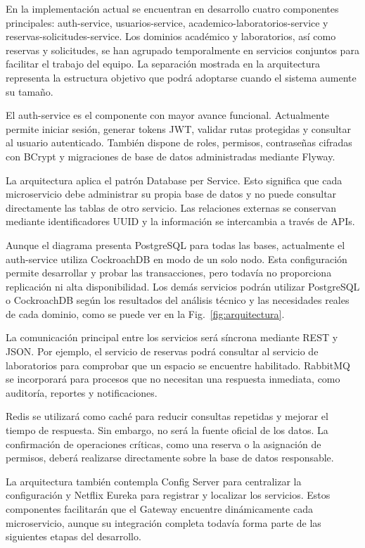 \documentclass[conference]{IEEEtran}
\begin{document}
En la implementación actual se encuentran en desarrollo cuatro componentes principales: auth-service, usuarios-service, academico-laboratorios-service y reservas-solicitudes-service. Los dominios académico y laboratorios, así como reservas y solicitudes, se han agrupado temporalmente en servicios conjuntos para facilitar el trabajo del equipo. La separación mostrada en la arquitectura representa la estructura objetivo que podrá adoptarse cuando el sistema aumente su tamaño.

El auth-service es el componente con mayor avance funcional. Actualmente permite iniciar sesión, generar tokens JWT, validar rutas protegidas y consultar al usuario autenticado. También dispone de roles, permisos, contraseñas cifradas con BCrypt y migraciones de base de datos administradas mediante Flyway.

La arquitectura aplica el patrón Database per Service. Esto significa que cada microservicio debe administrar su propia base de datos y no puede consultar directamente las tablas de otro servicio. Las relaciones externas se conservan mediante identificadores UUID y la información se intercambia a través de APIs.

Aunque el diagrama presenta PostgreSQL para todas las bases, actualmente el auth-service utiliza CockroachDB en modo de un solo nodo. Esta configuración permite desarrollar y probar las transacciones, pero todavía no proporciona replicación ni alta disponibilidad. Los demás servicios podrán utilizar PostgreSQL o CockroachDB según los resultados del análisis técnico y las necesidades reales de cada dominio, como se puede ver en la Fig.~\ref{fig:arquitectura}.

La comunicación principal entre los servicios será síncrona mediante REST y JSON. Por ejemplo, el servicio de reservas podrá consultar al servicio de laboratorios para comprobar que un espacio se encuentre habilitado. RabbitMQ se incorporará para procesos que no necesitan una respuesta inmediata, como auditoría, reportes y notificaciones.

Redis se utilizará como caché para reducir consultas repetidas y mejorar el tiempo de respuesta. Sin embargo, no será la fuente oficial de los datos. La confirmación de operaciones críticas, como una reserva o la asignación de permisos, deberá realizarse directamente sobre la base de datos responsable.

La arquitectura también contempla Config Server para centralizar la configuración y Netflix Eureka para registrar y localizar los servicios. Estos componentes facilitarán que el Gateway encuentre dinámicamente cada microservicio, aunque su integración completa todavía forma parte de las siguientes etapas del desarrollo.
\end{document}
